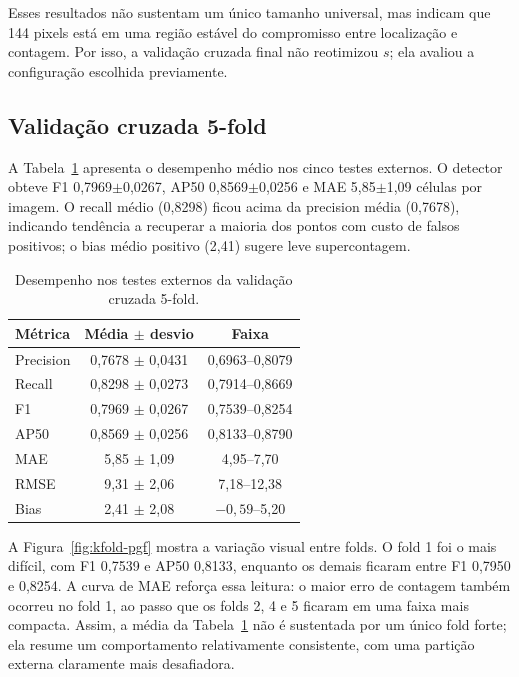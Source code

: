 Esses resultados n\~ao sustentam um \'unico tamanho universal, mas indicam que
144 pixels est\'a em uma regi\~ao est\'avel do compromisso entre localiza\c{c}\~ao e
contagem. Por isso, a valida\c{c}\~ao cruzada final n\~ao reotimizou $s$; ela avaliou a
configura\c{c}\~ao escolhida previamente.

\subsection{Valida\c{c}\~ao cruzada 5-fold}

A Tabela~\ref{tab:kfold-resumo} apresenta o desempenho m\'edio nos cinco testes
externos. O detector obteve F1 0,7969$\pm$0,0267, AP50
0,8569$\pm$0,0256 e MAE 5,85$\pm$1,09 c\'elulas por imagem. O recall m\'edio
(0,8298) ficou acima da precision m\'edia (0,7678), indicando tend\^encia a
recuperar a maioria dos pontos com custo de falsos positivos; o bias m\'edio
positivo (2,41) sugere leve supercontagem.

\begin{table}[htbp]
\centering
\caption{Desempenho nos testes externos da valida\c{c}\~ao cruzada 5-fold.}
\label{tab:kfold-resumo}
\small
\setlength{\tabcolsep}{5pt}
\begin{tabular}{lcc}
\toprule
M\'etrica & M\'edia $\pm$ desvio & Faixa \\
\midrule
Precision & 0,7678 $\pm$ 0,0431 & 0,6963--0,8079 \\
Recall & 0,8298 $\pm$ 0,0273 & 0,7914--0,8669 \\
F1 & 0,7969 $\pm$ 0,0267 & 0,7539--0,8254 \\
AP50 & 0,8569 $\pm$ 0,0256 & 0,8133--0,8790 \\
MAE & 5,85 $\pm$ 1,09 & 4,95--7,70 \\
RMSE & 9,31 $\pm$ 2,06 & 7,18--12,38 \\
Bias & 2,41 $\pm$ 2,08 & $-0,59$--5,20 \\
\bottomrule
\end{tabular}
\end{table}

A Figura~\ref{fig:kfold-pgf} mostra a varia\c{c}\~ao visual entre folds. O fold 1
foi o mais dif\'icil, com F1 0,7539 e AP50 0,8133, enquanto os demais ficaram
entre F1 0,7950 e 0,8254. A curva de MAE refor\c{c}a essa leitura: o maior erro
de contagem tamb\'em ocorreu no fold 1, ao passo que os folds 2, 4 e 5 ficaram
em uma faixa mais compacta. Assim, a m\'edia da Tabela~\ref{tab:kfold-resumo}
n\~ao \'e sustentada por um \'unico fold forte; ela resume um comportamento
relativamente consistente, com uma parti\c{c}\~ao externa claramente mais
desafiadora.

